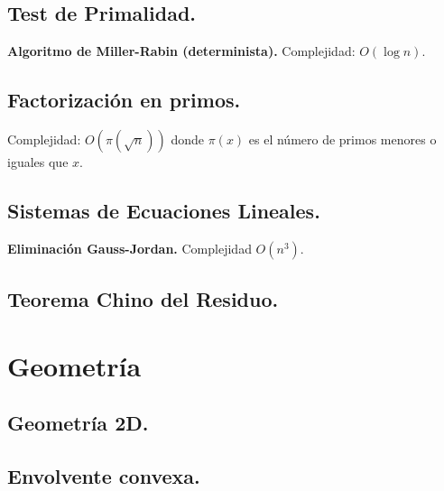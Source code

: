 \documentclass[10pt, letterpaper, twoside]{article}
\begin{document}
\subsection{Test de Primalidad.}

\textbf{Algoritmo de Miller-Rabin (determinista).} Complejidad: $O(\log n)$.

 

\subsection{Factorización en primos.}

Complejidad: $O\left(\pi\left(\sqrt{n}\right)\right)$ donde $\pi(x)$ es el número de primos menores o iguales que $x$.



\subsection{Sistemas de Ecuaciones Lineales.}

\textbf{Eliminación Gauss-Jordan.} Complejidad $O(n^3)$.



\subsection{Teorema Chino del Residuo.}




\section{Geometría}

\subsection{Geometría 2D.}



\subsection{Envolvente convexa.}
\end{document}
